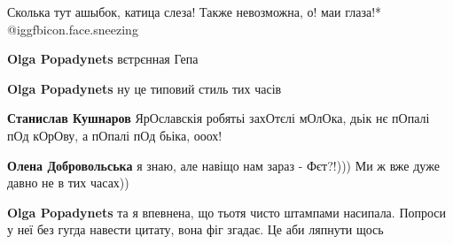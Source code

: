 \begin{itemize}
 
Сколька тут ашыбок, катица слеза!
Также невозможна,
о! маи глаза!* @igg{fbicon.face.sneezing} 

 
\textbf{Olga Popadynets} вєтрєнная Гепа

 
\textbf{Olga Popadynets} ну це типовий стиль тих часів

 
\textbf{Станислав Кушнаров} ЯрОславскія робятьі захОтєлі мОлОка, дьік нє пОпалі пОд кОрОву, а пОпалі пОд бьіка, ооох!

 
\textbf{Олена Добровольська} я знаю, але навіщо нам зараз - Фєт?!))) Ми ж вже дуже давно не в тих часах))

 
\textbf{Olga Popadynets} та я впевнена, що тьотя чисто штампами насипала.
Попроси у неї без гугда навести цитату, вона фіг згадає. Це аби ляпнути щось

\end{itemize}

